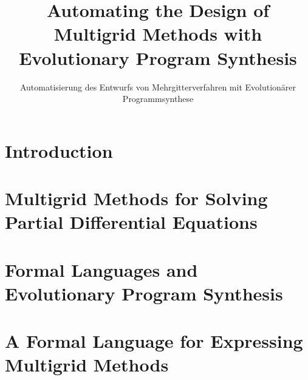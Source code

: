 \documentclass[
  paper = a5paper,
  language = english,
  acronym = nosymbol,
  acronymline = novertical,
  bibliography = combined,
  bibliographypart = all,
  titlesize = Huge,
  par = halfskip,
]{faupress}
\title{Automating the Design of Multigrid Methods with Evolutionary Program Synthesis}
\subtitle{Automatisierung des Entwurfs von Mehrgitterverfahren mit Evolutionärer Programmsynthese}
\institute{Lehrstuhl für Informatik 10}
\theoremstyle{definition}
\numberwithin{equation}{chapter}
\begin{document}

\frontmatter
  
  \makefacultytitle

  \begin{abstract}
    
  \end{abstract}
  \begin{zusammenfassung}
    
  \end{zusammenfassung}

  \tableofcontents

\mainmatter

\chapter{Introduction}


\chapter{Multigrid Methods for Solving Partial Differential Equations}
  
  
  
\chapter{Formal Languages and Evolutionary Program Synthesis}
\label{chapter:formal-languages-and-gp}
  
  
\chapter{A Formal Language for Expressing Multigrid Methods}
\label{chapter:multigrid-formal-language}
  
\end{document}
